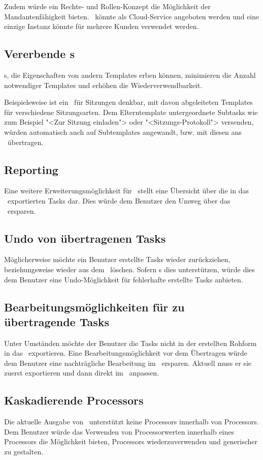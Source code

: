 			Zudem würde ein Rechte- und Rollen-Konzept die Möglichkeit der Mandantenfähigkeit bieten.
			\eeppi\ könnte als Cloud-Service angeboten werden und eine einzige Instanz könnte für mehrere Kunden verwendet werden.
			
		
		\subsection{Vererbende \ttpl s}
			\ttpl s, die Eigenschaften von andern Templates erben können, 
			minimieren die Anzahl notwendiger Templates und erhöhen die Wiederverwendbarkeit.
			
			Beispielsweise ist ein \ttpl\ für Sitzungen denkbar, mit
			davon abgeleiteten Templates für verschiedene Sitzungsarten.
			Dem Elterntemplate untergeordnete Subtasks wie zum Beispiel "<Zur Sitzung einladen"> oder "<Sitzungs-Protokoll"> versenden, würden automatisch auch auf Subtemplates angewandt, bzw. mit diesen ans \ppt\ übertragen.
			
		
		\subsection{Reporting}
			Eine weitere Erweiterungsmöglichkeit für \eeppi\ stellt eine Übersicht über die in das \ppt\ exportierten Tasks dar.
			Dies würde dem Benutzer den Umweg über das \ppt\ ersparen.
		
		
		\subsection{Undo von übertragenen Tasks}
			Möglicherweise möchte ein Benutzer erstellte Tasks wieder zurückziehen,
			beziehungsweise wieder aus dem \ppt\ löschen.
			Sofern \ppt s dies unterstützen, würde dies dem Benutzer eine Undo-Möglichkeit für fehlerhafte erstellte Tasks anbieten.
		
		
		\subsection{Bearbeitungsmöglichkeiten für zu übertragende Tasks}
			Unter Umständen möchte der Benutzer die Tasks nicht in der erstellten Rohform in das \ppt\ exportieren.
			Eine Bearbeitungsmöglichkeit vor dem Übertragen würde dem Benutzer eine nachträgliche Bearbeitung im \ppt\ ersparen.
			Aktuell muss er sie zuerst exportieren und dann direkt im \ppt\ anpassen.
			
			
		\subsection{Kaskadierende Processors}
			Die aktuelle Ausgabe von \eeppi\ unterstützt keine Processors innerhalb von Processors.
			Dem Benutzer würde das Verwenden von Processorwerten innerhalb eines Processors die Möglichkeit bieten, Processors wiederzuverwenden und generischer zu gestalten.
			

